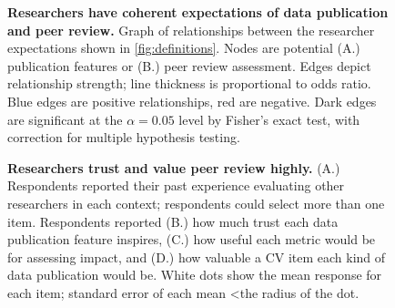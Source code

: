 \documentclass[10pt]{article}
\begin{document}
\begin{figure}[!ht]
\begin{center}
\end{center}
\caption{
{\bf Researchers have coherent expectations of data publication and peer review.}
Graph of relationships between the researcher expectations shown in \ref{fig:definitions}. 
Nodes are potential (A.) publication features or (B.) peer review assessment.
Edges depict relationship strength; line thickness is proportional to odds ratio. Blue edges are positive relationships, red are negative. Dark edges are significant at the $\alpha=0.05$ level by Fisher's exact test, with correction for multiple hypothesis testing.
}
\label{fig:definition_web}
\end{figure}


\begin{figure}[!ht]
\begin{center}
\end{center}
\caption{
{\bf Researchers trust and value peer review highly.}
(A.) Respondents reported their past experience evaluating other researchers in each context; respondents could select more than one item.
Respondents reported (B.) how much trust each data publication feature inspires, (C.) how useful each metric would be for assessing impact, and (D.) how valuable a CV item each kind of data publication would be.
White dots show the mean response for each item; standard error of each mean \textless the radius of the dot.
}

\label{fig:values}
\end{figure}
\end{document}
